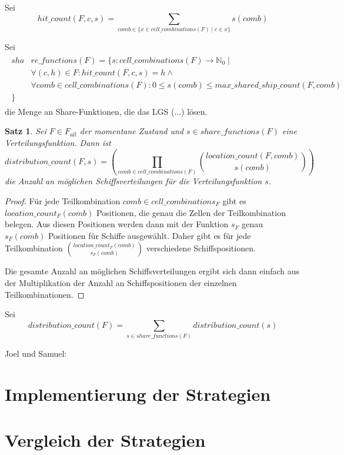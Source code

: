 \documentclass[a4paper,12pt]{llncs}
\numberwithin{equation}{section}
\newtheorem{satz}{Satz}
\begin{document}
\begin{definition}
Sei
\[
hit\_count(F, c, s)=\sum_{comb \in \{x \in cell\_combinations(F) \mid c \in x\}}{s(comb)}
\]
\end{definition}

\begin{definition}
Sei
\begin{align}
\begin{split}
sha&re\_functions(F)=\{s \colon cell\_combinations(F) \rightarrow \mathbb{N}_0 \mid\\
&\forall{(c,h) \in F}\colon hit\_count(F, c, s)=h \wedge \\
&\forall{comb \in cell\_combinations(F)} \colon 0 \leq s(comb) \leq max\_shared\_ship\_count(F, comb)\\
\}\;\;\;& \nonumber
\end{split}
\end{align}
die Menge an Share-Funktionen, die das LGS (...) lösen.
\end{definition}

\begin{satz}
Sei $F\in F_{all}$ der momentane Zustand und $s \in share\_functions(F)$ eine Verteilungsfunktion.
Dann ist
\[
distribution\_count(F, s)=
\left( \prod_{comb \in cell\_combinations(F)}{{location\_count(F, comb)\choose s(comb)}} \right)
\]
die Anzahl an möglichen Schiffsverteilungen für die Verteilungsfunktion $s$.
\end{satz}

\begin{proof}
Für jede Teilkombination $comb \in cell\_combinations_F$ gibt es $location\_count_F(comb)$ Positionen, die genau die Zellen der Teilkombination belegen. Aus diesen Positionen werden dann mit der Funktion $s_F$ genau $s_F(comb)$ Positionen für Schiffe ausgewählt. Daher gibt es für jede Teilkombination ${location\_count_F(comb)\choose s_F(comb)}$ verschiedene Schiffspositionen.

Die gesamte Anzahl an möglichen Schiffsverteilungen ergibt sich dann einfach aus der Multiplikation der Anzahl an Schiffspositionen der einzelnen Teilkombinationen.
\end{proof}

\begin{definition}
Sei
\[
distribution\_count(F)=\sum_{s \in share\_functions(F)}{distribution\_count(s)}
\]
\end{definition}

Joel und Samuel:

\section{Implementierung der Strategien}

\section{Vergleich der Strategien}


\newpage

 

\end{document}
